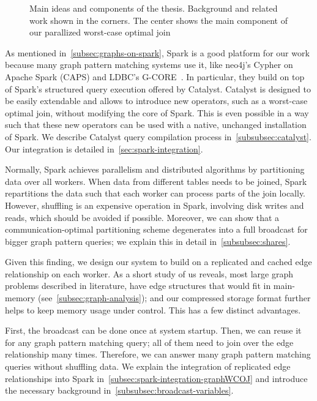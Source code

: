 \begin{figure}
    \centering
    
    \caption{
    Main ideas and components of the thesis.
    Background and related work shown in the corners.
    The center shows the main component of our parallized worst-case optimal join
    }
    \label{fig:thesis-overview}
\end{figure}

As mentioned in~\cref{subsec:graphs-on-spark}, Spark is a good platform for our work because many graph pattern matching systems use
it, like neo4j's Cypher on Apache Spark (CAPS) and LDBC's G-CORE~\cite{caps,gcore}.
In particular, they build on top of Spark's structured query execution offered by Catalyst.
Catalyst is designed to be easily extendable and allows to introduce new operators, such as a worst-case optimal join,
without modifying the core of Spark.
This is even possible in a way such that these new operators can be used with a native, unchanged installation of Spark.
We describe Catalyst query compilation process in~\cref{subsubsec:catalyst}.
Our integration is detailed in~\cref{sec:spark-integration}.

Normally, Spark achieves parallelism and distributed algorithms by partitioning data over all workers.
When data from different tables needs to be joined, Spark repartitions the data such that each worker can process parts of the join locally.
However, shuffling is an expensive operation in Spark, involving disk writes and reads, which should be avoided if possible.
Moreover, we can show that a communication-optimal partitioning scheme degenerates into a full broadcast for bigger graph pattern queries;
we explain this in detail in~\cref{subsubsec:shares}.

Given this finding, we design our system to build on a replicated and cached edge relationship on each worker.
As a short study of us reveals, most large graph problems described in literature, have edge structures that would fit in
main-memory (see~\cref{subsec:graph-analysis});
and our compressed storage format further helps to keep memory usage under control.
This has a few distinct advantages.

First, the broadcast can be done once at system startup.
Then, we can reuse it for any graph pattern matching query;
all of them need to join over the edge relationship many times.
Therefore, we can answer many graph pattern matching queries without shuffling data.
We explain the integration of replicated edge relationships into Spark in~\cref{subsec:spark-integration-graphWCOJ} and introduce
the necessary background in~\cref{subsubsec:broadcast-variables}.

